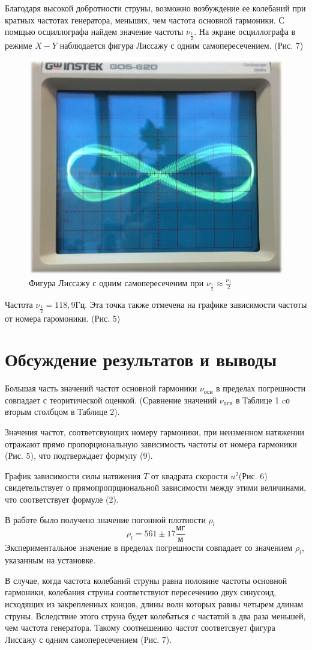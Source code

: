 \documentclass[a4paper,12pt]{article} %
\begin{document}
Благодаря высокой добротности струны, возможно возбуждение ее колебаний при кратных частотах генератора, меньших, чем частота основной гармоники. С помщью осциллографа найдем значение частоты $\nu_{\frac{1}{2}}$.  На экране осциллографа в режиме $X-Y$ наблюдается фигура Лиссажу с одним самопересечением. (Рис. 7)
\begin{figure}[h]
\centering
\includegraphics[scale=0.4]{10}
\caption{Фигура Лиссажу с одним самопересеченим при $\nu_{\frac{1}{2}} \approx \frac{\nu_1}{2}$}
\end{figure}

Частота $\nu_{\frac{1}{2}}=118,9 \text{Гц}$. Эта точка также отмечена на графике зависимости частоты от номера гаромоники. (Рис. 5)
\section{Обсуждение результатов и выводы}
Большая часть значений частот основной гармоники $\nu_\text{осн}$  в пределах погрешности совпадает с теоритической оценкой. (Сравнение значений $\nu_\text{осн}$ в Таблице 1 cо вторым столбцом в Таблице 2). 

Значения частот, соответсвующих номеру гармоники, при неизменном натяжении отражают прямо пропорциональную зависимость частоты от номера гармоники (Рис. 5), что подтверждает формулу (9).

График зависимости силы натяжения $T$ от квадрата скорости $u^2$(Рис. 6) свидетельствует о прямопропрциональной зависимости между этими величинами, что соответствует формуле (2).

В работе было получено значение погонной плотности $\rho_l$
\[\rho_l = 561\pm17\frac{\text{мг}}{\text{м}}\]
Экспериментальное значение в пределах погрешности совпадает со значением $\rho_l$, указанным на установке.

В случае, когда частота колебаний струны равна половине частоты основной гармоники, колебания струны соответствуют пересечению двух синусоид, исходящих из закрепленных концов, длины волн которых равны четырем длинам струны. Вследствие этого струна будет колебаться с частатой в два раза меньшей, чем частота генератора. Такому соотнешению частот соответсвует фигура Лиссажу с одним самопересечением (Рис. 7).
\end{document}
